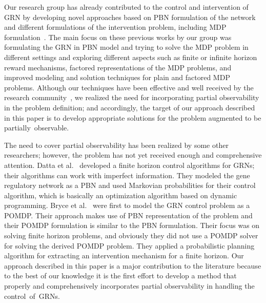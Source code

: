 Our research group has already contributed to the control and intervention of GRN by developing novel
approaches based on PBN formulation of the network and different formulations of the intervention problem,
including MDP formulation~\cite{Abul04,Abul06,Tan08,Tan10,Tan10b}. The main focus on these previous works by
our group was formulating the GRN in PBN model and trying to solve the MDP problem in different settings and
exploring different aspects such as finite or infinite horizon reward mechanisms, factored representations of
the MDP problems, and improved modeling and solution techniques for plain and factored MDP problems.
Although our techniques have been effective and well received by the research
community~\cite{Abul04,Abul06,Tan08,Tan10,Tan10b}, we realized the need for incorporating partial
observability in the problem definition; and accordingly, the target of our approach described in this paper
is to develop appropriate solutions for the problem augmented to be partially~observable.

The need to cover partial observability has been realized by some other researchers; however, the problem has
not yet received enough and comprehensive attention. Datta et al.~\cite{Datta03} developed a finite horizon
control algorithms for GRNs; their algorithms can work with imperfect information. They modeled the gene
regulatory network as a PBN and used Markovian probabilities for their control algorithm, which is basically
an optimization algorithm based on dynamic programming. Bryce et al.~\cite{Bryce07} were first to model the
GRN control problem as a POMDP. Their approach makes use of PBN representation of the problem and their POMDP
formulation is similar to the PBN formulation. Their focus was on solving finite horizon problems, and
obviously they did not use a POMDP solver for solving the derived POMDP problem. They applied a probabilistic
planning algorithm for extracting an intervention mechanism for a finite horizon. Our approach described in
this paper is a major contribution to the literature because to the best of our knowledge it is the first
effort to develop a method that properly and comprehensively incorporates partial observability in handling
the control~of~GRNs.
